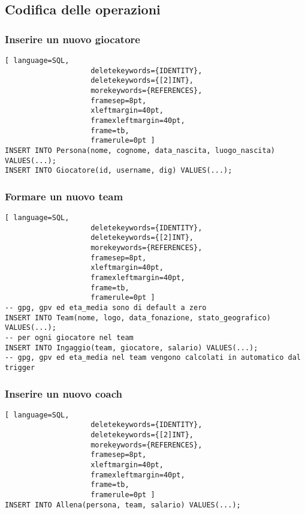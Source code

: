 \documentclass{article}
\begin{document}
\subsection{Codifica delle operazioni}

\subsubsection{Inserire un nuovo giocatore}
\begin{lstlisting}[ language=SQL,
                    deletekeywords={IDENTITY},
                    deletekeywords={[2]INT},
                    morekeywords={REFERENCES},
                    framesep=8pt,
                    xleftmargin=40pt,
                    framexleftmargin=40pt,
                    frame=tb,
                    framerule=0pt ]
INSERT INTO Persona(nome, cognome, data_nascita, luogo_nascita) VALUES(...);
INSERT INTO Giocatore(id, username, dig) VALUES(...);
\end{lstlisting}

\subsubsection{Formare un nuovo team}
\begin{lstlisting}[ language=SQL,
                    deletekeywords={IDENTITY},
                    deletekeywords={[2]INT},
                    morekeywords={REFERENCES},
                    framesep=8pt,
                    xleftmargin=40pt,
                    framexleftmargin=40pt,
                    frame=tb,
                    framerule=0pt ]
-- gpg, gpv ed eta_media sono di default a zero
INSERT INTO Team(nome, logo, data_fonazione, stato_geografico) VALUES(...);
-- per ogni giocatore nel team
INSERT INTO Ingaggio(team, giocatore, salario) VALUES(...);
-- gpg, gpv ed eta_media nel team vengono calcolati in automatico dal trigger
\end{lstlisting}

\subsubsection{Inserire un nuovo coach}
\begin{lstlisting}[ language=SQL,
                    deletekeywords={IDENTITY},
                    deletekeywords={[2]INT},
                    morekeywords={REFERENCES},
                    framesep=8pt,
                    xleftmargin=40pt,
                    framexleftmargin=40pt,
                    frame=tb,
                    framerule=0pt ]
INSERT INTO Allena(persona, team, salario) VALUES(...);
\end{lstlisting}
\end{document}
